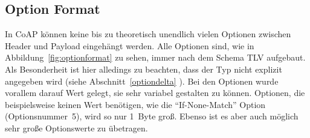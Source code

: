\subsection{Option Format}
\label{optionFormat}
In \ac{CoAP} können keine bis zu theoretisch unendlich vielen Optionen zwischen Header und 
Payload eingehängt werden.
Alle Optionen sind, wie in Abbildung~\ref{fig:optionformat} zu sehen, immer nach dem Schema \ac{TLV} aufgebaut.
Als Besonderheit ist hier alledings zu beachten, dass der Typ nicht explizit
angegeben wird (siehe Abschnitt~\ref{optiondelta} ).
Bei den Optionen wurde vorallem darauf Wert gelegt, sie sehr variabel gestalten zu können.
Optionen, die beispielsweise keinen Wert benötigen, wie die "`If-None-Match"' Option
(Optionsnummer~5), wird so nur 1~Byte groß.
Ebenso ist es aber auch möglich sehr große Optionswerte zu übetragen.
